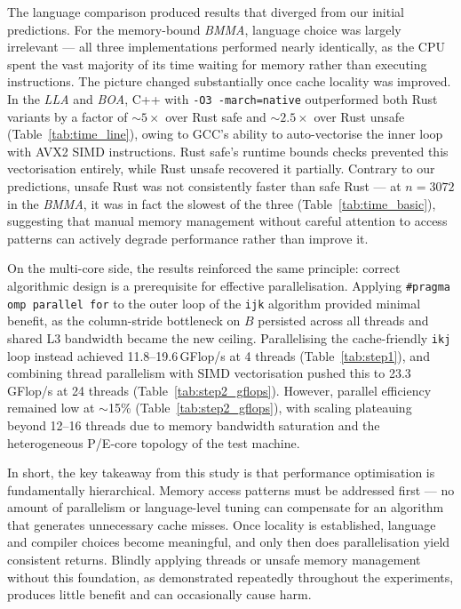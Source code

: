 \documentclass[12pt,a4paper]{article}
\begin{document}
The language comparison produced results that diverged from our initial
predictions. For the memory-bound \textit{BMMA}, language choice was largely
irrelevant --- all three implementations performed nearly identically, as the
CPU spent the vast majority of its time waiting for memory rather than
executing instructions. The picture changed substantially once cache locality
was improved. In the \textit{LLA} and \textit{BOA}, C++ with
\texttt{-O3 -march=native} outperformed both Rust variants by a factor of
$\sim$$5\times$ over Rust safe and $\sim$$2.5\times$ over Rust unsafe
(Table~\ref{tab:time_line}), owing
to GCC's ability to auto-vectorise the inner loop with AVX2 SIMD instructions.
Rust safe's runtime bounds checks prevented this vectorisation entirely, while
Rust unsafe recovered it partially. Contrary to our predictions, unsafe Rust
was not consistently faster than safe Rust --- at $n = 3072$ in the
\textit{BMMA}, it was in fact the slowest of the three (Table~\ref{tab:time_basic}), suggesting that manual
memory management without careful attention to access patterns can actively
degrade performance rather than improve it.

On the multi-core side, the results reinforced the same principle: correct
algorithmic design is a prerequisite for effective parallelisation. Applying
\texttt{\#pragma omp parallel for} to the outer loop of the \texttt{ijk}
algorithm provided minimal benefit, as the column-stride bottleneck on $B$
persisted across all threads and shared L3 bandwidth became the new ceiling.
Parallelising the cache-friendly \texttt{ikj} loop instead achieved
11.8--19.6\,GFlop/s at 4 threads (Table~\ref{tab:step1}), and combining thread parallelism with SIMD
vectorisation pushed this to 23.3\,GFlop/s at 24 threads
(Table~\ref{tab:step2_gflops}). However, parallel
efficiency remained low at $\sim$15\% (Table~\ref{tab:step2_gflops}), with scaling plateauing beyond 12--16
threads due to memory bandwidth saturation and the heterogeneous P/E-core
topology of the test machine.

In short, the key takeaway from this study is that performance optimisation is
fundamentally hierarchical. Memory access patterns must be addressed first ---
no amount of parallelism or language-level tuning can compensate for an
algorithm that generates unnecessary cache misses. Once locality is
established, language and compiler choices become meaningful, and only then
does parallelisation yield consistent returns. Blindly applying threads or
unsafe memory management without this foundation, as demonstrated repeatedly
throughout the experiments, produces little benefit and can occasionally cause
harm.
\end{document}
